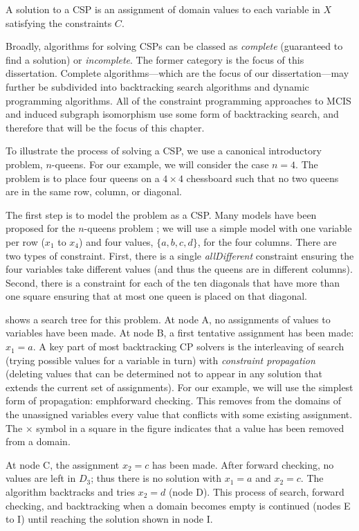 A solution to a CSP is an assignment of domain values to each variable in $X$
satisfying the constraints $C$.

Broadly, algorithms for solving CSPs can be classed as \emph{complete} (guaranteed to find a solution)
or \emph{incomplete}. The former category is the focus of this dissertation.
Complete algorithms---which are the focus of our dissertation---may further
be subdivided into backtracking search algorithms and dynamic programming
algorithms. All of the constraint programming approaches to MCIS and induced
subgraph isomorphism use some form of backtracking search, and therefore that will
be the focus of this chapter.

To illustrate the process of solving a CSP, we use a canonical introductory
problem, $n$-queens. For our example, we will consider the case $n=4$. The problem
is to place four queens on a $4 \times 4$ chessboard such that no two queens
are in the same row, column, or diagonal.

The first step is to model the problem as a CSP. Many models have been proposed
for the $n$-queens problem \citep{DBLP:reference/fai/Smith06}; we will use a
simple model with one variable per row ($x_1$ to $x_4$) and four values, $\{a, b, c, d\}$, for
the four columns.  There are two types of constraint. First, there is a single
\emph{allDifferent} constraint ensuring the four variables take different
values (and thus the queens are in different columns). Second, there is a
constraint for each of the ten diagonals that have more than one square
ensuring that at most one queen is placed on that diagonal.

 shows a search tree for this problem. At node A,
no assignments of values to variables have been made. At node B, a first
tentative assignment has been made: $x_1=a$. A key part of most backtracking CP
solvers is the interleaving of search (trying possible values for a variable
in turn) with \emph{constraint propagation} (deleting values that can be
determined not to appear in any solution that extends the current set of
assignments). For our example, we will use the simplest form of propagation:
emph{forward checking}. This removes from the domains of the unassigned variables
every value that conflicts with some existing assignment. The $\times$ symbol
in a square in the figure indicates that a value has been removed from a domain.

At node C, the assignment $x_2=c$ has been made. After forward checking, no
values are left in $D_3$; thus there is no solution with $x_1=a$ and $x_2=c$.
The algorithm backtracks and tries $x_2=d$
(node D). This process of search, forward checking, and backtracking when
a domain becomes empty is continued (nodes E to I) until reaching the solution
shown in node I.

